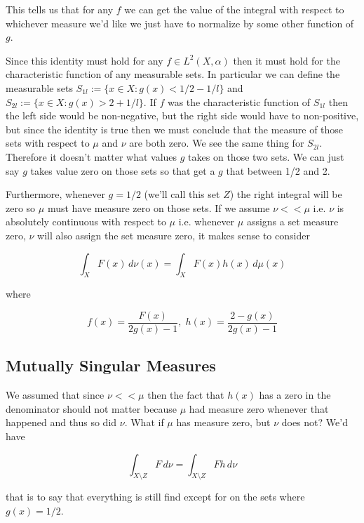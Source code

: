 \documentclass[oneside]{book}
\begin{document}
This tells us that for any $f$ we can get the value of the integral with respect to whichever measure we'd like we just have to normalize by some other function of $g$.

Since this identity must hold for any $f \in L^2(X,\alpha)$ then it must hold for the characteristic function of any measurable sets. In particular we can define the measurable sets $S_{1l} := \{x \in X: g(x) < 1/2-1/l \}$ and $S_{2l} := \{x \in X: g(x) > 2+ 1/l\}$. If $f$ was the characteristic function of $S_{1l}$ then the left side would be non-negative, but the right side would have to non-positive, but since the identity is true then we must conclude that the measure of those sets with respect to $\mu$ and $\nu$ are both zero. We see the same thing for $S_{2l}$. Therefore it doesn't matter what values $g$ takes on those two sets. We can just say $g$ takes value zero on those sets so that get a $g$ that between 1/2 and 2.

Furthermore, whenever $g=1/2$ (we'll call this set $Z$) the right integral will be zero so $\mu$ must have measure zero on those sets. If we assume $\nu << \mu$ i.e. $\nu$ is absolutely continuous with respect to $\mu$ i.e. whenever $\mu$ assigns a set measure zero, $\nu$ will also assign the set measure zero,  it makes sense to consider

\begin{equation}
\int_X F(x)\, d\nu(x) = \int_X F(x) h(x)\, d\mu(x)
\end{equation}

where

\begin{equation}
f(x) = \frac{F(x)}{2g(x)-1},\; h(x)=\frac{2-g(x)}{2g(x)-1}
\end{equation}

\subsection{Mutually Singular Measures}
We assumed that since $\nu << \mu$ then the fact that $h(x)$ has a zero in the denominator should not matter because $\mu$ had measure zero whenever that happened and thus so did $\nu$. What if $\mu$ has measure zero, but $\nu$ does not? We'd have

\begin{equation}
\int_{X \setminus Z} F\, d\nu = \int_{X \setminus Z} Fh\, d\nu
\end{equation}

that is to say that everything is still find except for on the sets where $g(x)=1/2$.
\end{document}
